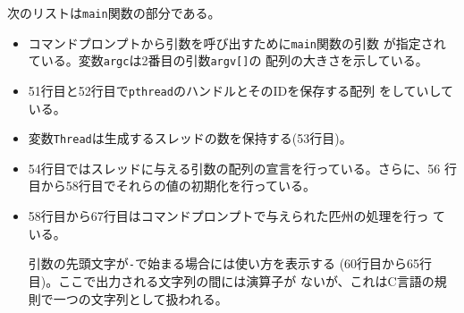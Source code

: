 	次のリストは\texttt{main}関数の部分である。
\begin{itemize}
 \item コマンドプロンプトから引数を呼び出すために\texttt{main}関数の引数
			 が指定されている。変数\texttt{argc}は2番目の引数\texttt{argv[]}の
			 配列の大きさを示している。
 \item 51行目と52行目で\texttt{pthread}のハンドルとそのIDを保存する配列
			 をしていしている。
 \item 変数\texttt{Thread}は生成するスレッドの数を保持する(53行目)。
 \item 54行目ではスレッドに与える引数の配列の宣言を行っている。さらに、56
			 行目から58行目でそれらの値の初期化を行っている。
 \item 58行目から67行目はコマンドプロンプトで与えられた匹州の処理を行っ
			 ている。

			 引数の先頭文字が\texttt{-}で始まる場合には使い方を表示する
							(60行目から65行目)。ここで出力される文字列の間には演算子が
							ないが、これはC言語の規則で一つの文字列として扱われる。
\end{itemize}
\fi